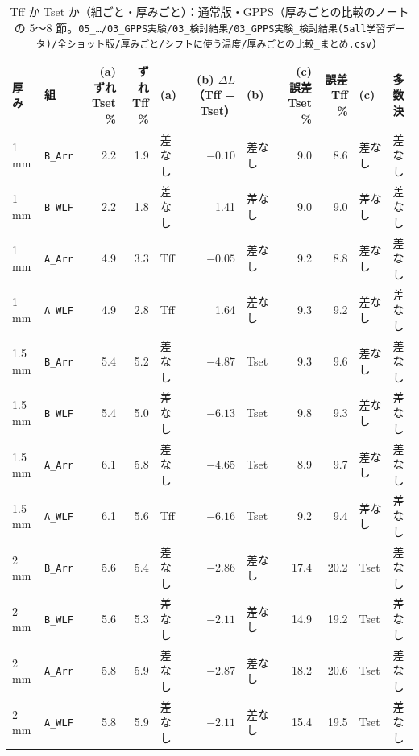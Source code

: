 \documentclass[paper=a4paper,landscape,fontsize=10pt,line_length=62zw,number_of_lines=34]{jlreq}
\begin{document}
\begin{table}[H]\centering\footnotesize
\caption{Tff か Tset か（組ごと・厚みごと）：通常版・GPPS（厚みごとの比較のノートの 5〜8 節。\texttt{05\_\allowbreak{}…/\allowbreak{}03\_\allowbreak{}GPPS実験/\allowbreak{}03\_\allowbreak{}検討結果/\allowbreak{}03\_\allowbreak{}GPPS実験\_\allowbreak{}検討結果(5all学習データ)/\allowbreak{}全ショット版/\allowbreak{}厚みごと/\allowbreak{}シフトに使う温度/\allowbreak{}厚みごとの比較\_\allowbreak{}まとめ.csv}）}
\begin{tabular}{llrrlrlrrll}
\toprule
厚み & 組 & (a) ずれ Tset \% & ずれ Tff \% & (a) & (b) $\Delta L$（Tff − Tset） & (b) & (c) 誤差 Tset \% & 誤差 Tff \% & (c) & 多数決 \\
\midrule
1 mm & \texttt{B\_\allowbreak{}Arr} & 2.2 & 1.9 & 差なし & $-0.10$ & 差なし & 9.0 & 8.6 & 差なし & 差なし \\
1 mm & \texttt{B\_\allowbreak{}WLF} & 2.2 & 1.8 & 差なし & 1.41 & 差なし & 9.0 & 9.0 & 差なし & 差なし \\
1 mm & \texttt{A\_\allowbreak{}Arr} & 4.9 & 3.3 & Tff & $-0.05$ & 差なし & 9.2 & 8.8 & 差なし & 差なし \\
1 mm & \texttt{A\_\allowbreak{}WLF} & 4.9 & 2.8 & Tff & 1.64 & 差なし & 9.3 & 9.2 & 差なし & 差なし \\
1.5 mm & \texttt{B\_\allowbreak{}Arr} & 5.4 & 5.2 & 差なし & $-4.87$ & Tset & 9.3 & 9.6 & 差なし & 差なし \\
1.5 mm & \texttt{B\_\allowbreak{}WLF} & 5.4 & 5.0 & 差なし & $-6.13$ & Tset & 9.8 & 9.3 & 差なし & 差なし \\
1.5 mm & \texttt{A\_\allowbreak{}Arr} & 6.1 & 5.8 & 差なし & $-4.65$ & Tset & 8.9 & 9.7 & 差なし & 差なし \\
1.5 mm & \texttt{A\_\allowbreak{}WLF} & 6.1 & 5.6 & Tff & $-6.16$ & Tset & 9.2 & 9.4 & 差なし & 差なし \\
2 mm & \texttt{B\_\allowbreak{}Arr} & 5.6 & 5.4 & 差なし & $-2.86$ & 差なし & 17.4 & 20.2 & Tset & 差なし \\
2 mm & \texttt{B\_\allowbreak{}WLF} & 5.6 & 5.3 & 差なし & $-2.11$ & 差なし & 14.9 & 19.2 & Tset & 差なし \\
2 mm & \texttt{A\_\allowbreak{}Arr} & 5.8 & 5.9 & 差なし & $-2.87$ & 差なし & 18.2 & 20.6 & Tset & 差なし \\
2 mm & \texttt{A\_\allowbreak{}WLF} & 5.8 & 5.9 & 差なし & $-2.11$ & 差なし & 15.4 & 19.5 & Tset & 差なし \\
\bottomrule
\end{tabular}
\end{table}
\clearpage
\end{document}
